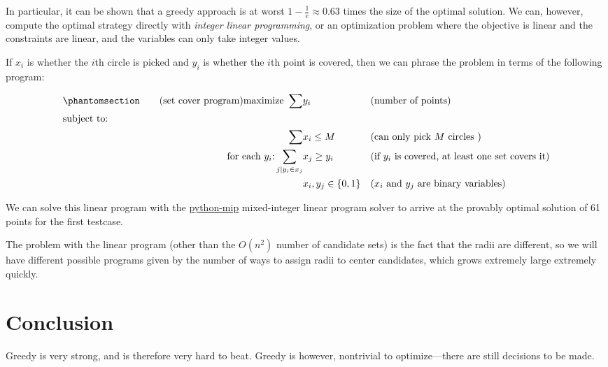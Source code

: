 \documentclass[11pt, oneside]{article}
\begin{document}
In particular, it can be shown that a greedy approach is at worst \( 1 -
\frac{1}{e} \approx 0.63 \) times the size of the optimal solution. We can,
however, compute the optimal strategy directly with \textit{integer linear
programming}, or an optimization problem where the objective is linear and the
constraints are linear, and the variables can only take integer values.

If \( x_i \) is whether the \( i \)th circle is picked and
\( y_i \) is whether the \( i \)th point is covered, then we
can phrase the problem in terms of the following program:
\newpage

\begin{align*}   
  \phantomsection
  \tag{set cover program}
  \text{maximize } \sum& y_i && \text{(number of points)} \\
  \shortintertext{subject to:}
  \sum& x_i \leq M && \text{(can only pick \( M \) circles )} \\
  \text{for each \( y_i \):} \sum_{j | y_i \in x_j}& x_j \geq y_i && 
  \text{(if \( y_i \) is covered, at least one set covers it)} \\
  &x_i, y_j \in \{0, 1\} && \text{(\( x_i \) and \( y_j \) are binary variables)}
\end{align*}

We can solve this linear program with the
\href{https://python-mip.readthedocs.io/en/latest/}{python-mip}
mixed-integer linear program solver to arrive at the provably
optimal solution of 61 points for the first testcase.

The problem with the linear program (other than the \( O(n^2) \) number of
candidate sets) is the fact that the radii are different, so we will have
different possible programs given by the number of ways to assign radii to
center candidates, which grows extremely large extremely quickly.

\section{Conclusion}

Greedy is very strong, and is therefore very hard to beat. Greedy is however,
nontrivial to optimize---there are still decisions to be made.

\end{document}
